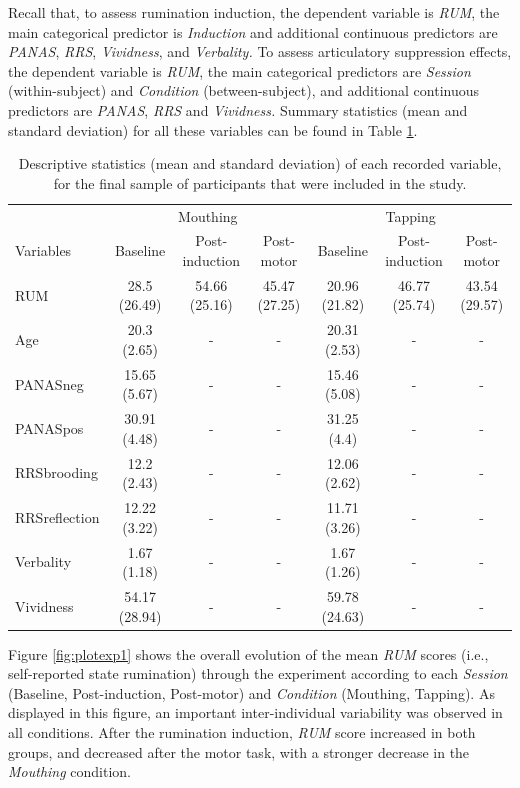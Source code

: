 \documentclass[a4paper,12pt,twoside,onecolumn,openright,final,oldfontcommands]{memoir}
\makeatletter
\newenvironment{lltable}{\begin{landscape}\begin{center}\begin{ThreePartTable}}{\end{ThreePartTable}\end{center}\end{landscape}}
\newcommand\LastLTentrywidth{1em}
\newlength\longtablewidth
\newcommand{\getlongtablewidth}{\begingroup \ifcsname LT@\roman{LT@tables}\endcsname \global\longtablewidth=0pt \renewcommand{\LT@entry}[2]{\global\advance\longtablewidth by ##2\relax\gdef\LastLTentrywidth{##2}}\@nameuse{LT@\roman{LT@tables}} \fi \endgroup}
\makeatother
\begin{document}
Recall that, to assess rumination induction, the dependent variable is \emph{RUM}, the main categorical predictor is \emph{Induction} and additional continuous predictors are \emph{PANAS}, \emph{RRS}, \emph{Vividness}, and \emph{Verbality.} To assess articulatory suppression effects, the dependent variable is \emph{RUM}, the main categorical predictors are \emph{Session} (within-subject) and \emph{Condition} (between-subject), and additional continuous predictors are \emph{PANAS}, \emph{RRS} and \emph{Vividness.} Summary statistics (mean and standard deviation) for all these variables can be found in Table \ref{tab:sumstat}.

\begin{lltable}
\small{
\begin{longtable}{lcccccc}\noalign{\getlongtablewidth\global\LTcapwidth=\longtablewidth}
\caption{\label{tab:sumstat}Descriptive statistics (mean and standard deviation) of each recorded variable, for the final sample of participants that were included in the study.}\\
\toprule
 & \multicolumn{3}{c}{Mouthing} & \multicolumn{3}{c}{Tapping} \\
\cmidrule(r){2-4} \cmidrule(r){5-7}
Variables & Baseline & Post-induction & Post-motor & Baseline & Post-induction & Post-motor\\
\midrule
RUM & 28.5 (26.49) & 54.66 (25.16) & 45.47 (27.25) & 20.96 (21.82) & 46.77 (25.74) & 43.54 (29.57)\\
Age & 20.3 (2.65) & - & - & 20.31 (2.53) & - & -\\
PANASneg & 15.65 (5.67) & - & - & 15.46 (5.08) & - & -\\
PANASpos & 30.91 (4.48) & - & - & 31.25 (4.4) & - & -\\
RRSbrooding & 12.2 (2.43) & - & - & 12.06 (2.62) & - & -\\
RRSreflection & 12.22 (3.22) & - & - & 11.71 (3.26) & - & -\\
Verbality & 1.67 (1.18) & - & - & 1.67 (1.26) & - & -\\
Vividness & 54.17 (28.94) & - & - & 59.78 (24.63) & - & -\\
\bottomrule
\end{longtable}
}
\end{lltable}

Figure \ref{fig:plotexp1} shows the overall evolution of the mean \emph{RUM} scores (i.e., self-reported state rumination) through the experiment according to each \emph{Session} (Baseline, Post-induction, Post-motor) and \emph{Condition} (Mouthing, Tapping). As displayed in this figure, an important inter-individual variability was observed in all conditions. After the rumination induction, \emph{RUM} score increased in both groups, and decreased after the motor task, with a stronger decrease in the \emph{Mouthing} condition.
\end{document}
